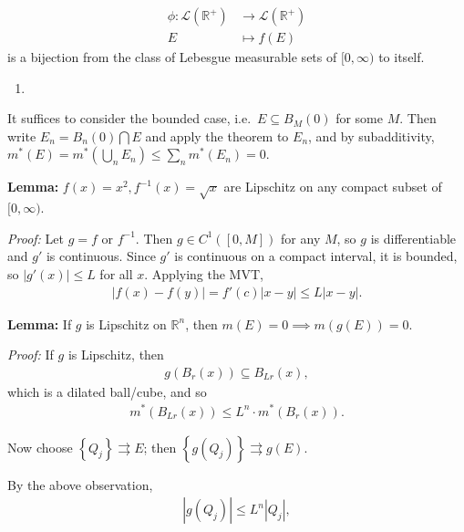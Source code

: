 \begin{align*}
\phi: \mathcal{L}({\mathbb{R}}^+) &\to \mathcal{L}({\mathbb{R}}^+) \\
E &\mapsto f(E)
\end{align*}
is a bijection from the class of Lebesgue measurable sets of
\([0, \infty)\) to itself.


\begin{solution}

\envlist

\begin{enumerate}
\def\labelenumi{\alph{enumi}.}
\tightlist
\item
\end{enumerate}

It suffices to consider the bounded case, i.e.~\(E \subseteq B_M(0)\)
for some \(M\). Then write \(E_n = B_n(0) \displaystyle\bigcap E\) and
apply the theorem to \(E_n\), and by subadditivity,
\(m^*(E) = m^*(\displaystyle\bigcup_n E_n) \leq \sum_n m^*(E_n) = 0\).

\textbf{Lemma:} \(f(x) = x^2, f^{-1}(x) = \sqrt{x}\) are Lipschitz on
any compact subset of \([0, \infty)\).

\emph{Proof:} Let \(g = f\) or \(f^{-1}\). Then \(g\in C^1([0, M])\) for
any \(M\), so \(g\) is differentiable and \(g'\) is continuous. Since
\(g'\) is continuous on a compact interval, it is bounded, so
\({\left\lvert {g'(x)} \right\rvert} \leq L\) for all \(x\). Applying
the MVT,
\begin{align*}
{\left\lvert {f(x) - f(y)} \right\rvert} = f'(c) {\left\lvert {x-y} \right\rvert} \leq L {\left\lvert {x-y} \right\rvert}
.\end{align*}

\textbf{Lemma:} If \(g\) is Lipschitz on \({\mathbb{R}}^n\), then
\(m(E) = 0 \implies m(g(E)) = 0\).

\emph{Proof:} If \(g\) is Lipschitz, then
\begin{align*}
g(B_r(x)) \subseteq B_{Lr}(x)
,\end{align*}
which is a dilated ball/cube, and so
\begin{align*}
m^*(B_{Lr}(x)) \leq L^n \cdot m^*(B_{r}(x))
.\end{align*}

Now choose \(\left\{{Q_j}\right\} \rightrightarrows E\); then
\(\left\{{g(Q_j)}\right\} \rightrightarrows g(E)\).

By the above observation,
\begin{align*}
{\left\lvert {g(Q_j)} \right\rvert} \leq L^n {\left\lvert {Q_j} \right\rvert}
,\end{align*}


\end{solution}
